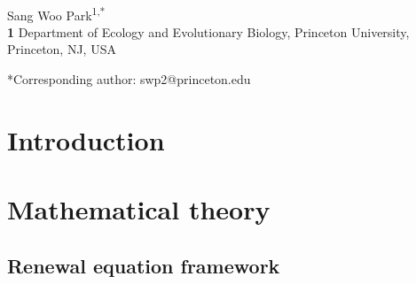 \documentclass[12pt]{article}
\date{\today}
\begin{document}
\begin{flushleft}{
	\Large
	\textbf{}
}
\newline
\\
Sang Woo Park\textsuperscript{1,*}
\\
\bigskip
\textbf{1} Department of Ecology and Evolutionary Biology, Princeton University, Princeton, NJ, USA
\\
\bigskip

*Corresponding author: swp2@princeton.edu
\end{flushleft}


\section{Introduction}

\section{Mathematical theory}

\subsection{Renewal equation framework}
\end{document}
